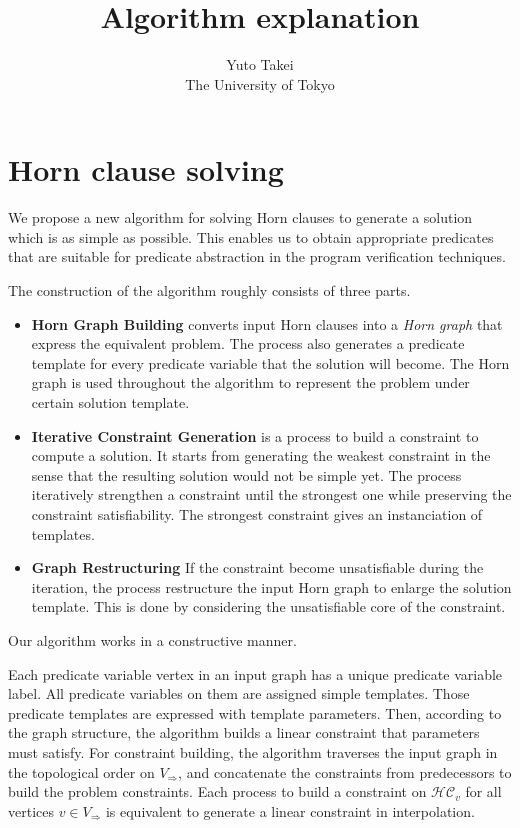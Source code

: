 \documentclass[a4paper,12pt]{article}
\title{Algorithm explanation}
\author{Yuto Takei \\ The University of Tokyo}
\begin{document}
\section{Horn clause solving}

We propose a new algorithm for solving Horn clauses to generate a
solution which is as simple as possible.  This enables us to obtain
appropriate predicates that are suitable for predicate abstraction in
the program verification techniques.

The construction of the algorithm roughly consists of three parts.
\begin{itemize}
\item \textbf{Horn Graph Building} converts input Horn clauses into a
  \emph{Horn graph} that express the equivalent problem. The process
  also generates a predicate template for every predicate variable
  that the solution will become.  The Horn graph is used throughout
  the algorithm to represent the problem under certain solution
  template.
\item \textbf{Iterative Constraint Generation} is a process to build a
  constraint to compute a solution.  It starts from generating the
  weakest constraint in the sense that the resulting solution would not
  be simple yet.  The process iteratively strengthen a constraint
  until the strongest one while preserving the constraint
  satisfiability. The strongest constraint gives an instanciation of
  templates.
\item \textbf{Graph Restructuring} If the constraint become
  unsatisfiable during the iteration, the process restructure the
  input Horn graph to enlarge the solution template.  This is done by
  considering the unsatisfiable core of the constraint.
\end{itemize}
Our algorithm works in a constructive manner.

Each predicate variable vertex in an input graph has a unique
predicate variable label.  All predicate variables on them are
assigned simple templates.  Those predicate templates are expressed
with template parameters.  Then, according to the graph structure, the
algorithm builds a linear constraint that parameters must satisfy.
For constraint building, the algorithm traverses the input graph in
the topological order on $V_\Rightarrow$, and concatenate the
constraints from predecessors to build the problem constraints.  Each
process to build a constraint on $\mathcal{HC}_v$ for all vertices $v
\in V_\Rightarrow$ is equivalent to generate a linear constraint in
interpolation.
\end{document}
